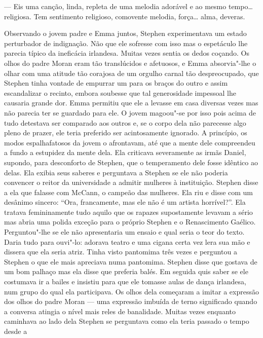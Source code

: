 --- Eis uma canção, linda, repleta de uma melodia adorável e ao
mesmo tempo\ldots{} religiosa.  Tem sentimento religioso, comovente
\label{melodia} melodia, força\ldots{} alma, deveras.

Observando o jovem padre e Emma juntos, Stephen experimentava um
estado perturbador de indignação.  Não que ele sofresse com isso mas o
espetáculo lhe parecia típico da ineficácia irlandesa.  Muitas vezes
sentia os dedos coçando.  Os olhos do padre Moran eram tão translúcidos
e afetuosos, e Emma absorvia"-lhe o olhar com uma atitude tão corajosa
de \label{um"-orgulho} um orgulho carnal tão despreocupado, que Stephen tinha vontade de
empurrar um para os braços do outro e assim escandalizar o recinto,
embora soubesse que tal generosidade impessoal lhe causaria grande dor.
Emma permitiu que ele a levasse em casa diversas vezes mas não parecia
ter se guardado para ele.  O jovem magoou"-se por isso pois acima de
tudo detestava ser comparado aos outros e, se o corpo dela não
parecesse algo pleno de prazer, ele teria preferido ser acintosamente
ignorado.  A princípio, os modos espalhafatosos da jovem o afrontavam,
até que a mente dele compreendeu a fundo a estupidez da mente dela.
Ela criticava severamente as irmãs Daniel, supondo, para desconforto de
Stephen, que o temperamento dele fosse idêntico ao delas.  Ela exibia
seus saberes e perguntava a Stephen se ele não poderia convencer o
reitor da universidade a admitir mulheres à instituição.  Stephen disse
a ela que falasse com McCann, o campeão das mulheres.  Ela riu e disse
com um \label{desanimo"-sincero} desânimo sincero: “Ora, francamente, mas ele não é um artista
horrível?”.  Ela tratava femininamente tudo aquilo que os rapazes
supostamente levavam a sério mas abria uma polida exceção para o
próprio Stephen e o Renascimento Gaélico.  Perguntou"-lhe se ele não
apresentaria um ensaio e qual seria o teor do texto.  Daria tudo para
ouvi"-lo: adorava teatro e uma cigana certa vez lera sua mão e dissera
que ela seria atriz.  Tinha visto pantomima três vezes e perguntou a
Stephen o que ele mais apreciava numa pantomima.  Stephen disse que
gostava de um bom palhaço mas ela disse que preferia balés.  Em seguida
quis saber se ele costumava ir a bailes e insistiu para que ele tomasse
aulas de dança irlandesa, num grupo do qual ela participava.  Os olhos
dela começaram a \label{imitar"-a} imitar a expressão dos olhos do padre Moran --- uma
expressão imbuída de terno \label{significado} significado quando a conversa atingia o
nível mais reles de banalidade.  Muitas vezes enquanto caminhava ao
lado dela Stephen se perguntava como ela teria passado o tempo desde a
